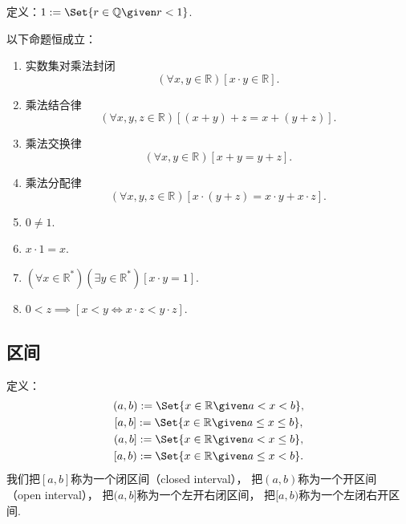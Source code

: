 \begin{definition}
定义：\(1\defeq\Set{ r\in\mathbb{Q} \given r < 1 }\).
\end{definition}

\begin{theorem}
以下命题恒成立：
\begin{enumerate}
	\item 实数集对乘法封闭\begin{equation}
		(\forall x,y\in\mathbb{R})[x \cdot y \in \mathbb{R}].
	\end{equation}
	\item 乘法结合律\begin{equation}
		(\forall x,y,z\in\mathbb{R})[(x+y)+z=x+(y+z)].
	\end{equation}
	\item 乘法交换律\begin{equation}
		(\forall x,y\in\mathbb{R})[x+y=y+z].
	\end{equation}
	\item 乘法分配律\begin{equation}
		(\forall x,y,z\in\mathbb{R})[x\cdot(y+z)=x \cdot y+x \cdot z].
	\end{equation}
	\item \(0\neq1\).
	\item \(x\cdot1=x\).
	\item \((\forall x\in\mathbb{R}^*)(\exists y\in\mathbb{R}^*)[x \cdot y=1]\).
	\item \(0<z \implies [x<y \iff x \cdot z<y \cdot z]\).
\end{enumerate}
\end{theorem}

\subsection{区间}
定义：\begin{gather}
	(a,b) \defeq \Set{ x\in\mathbb{R} \given a<x<b }, \\
	[a,b] \defeq \Set{ x\in\mathbb{R} \given a \leq x \leq b }, \\
	(a,b] \defeq \Set{ x\in\mathbb{R} \given a < x \leq b }, \\
	[a,b) \defeq \Set{ x\in\mathbb{R} \given a \leq x < b }.
\end{gather}
我们把\([a,b]\)称为一个闭区间（closed interval），
把\((a,b)\)称为一个开区间（open interval），
把\((a,b]\)称为一个左开右闭区间，
把\([a,b)\)称为一个左闭右开区间.


